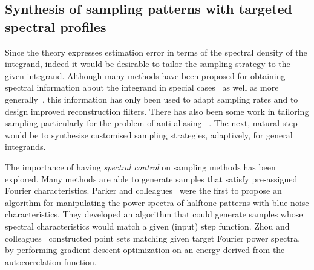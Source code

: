 \documentclass[11pt,fleqn]{book} %
\begin{document}
\subsection{Synthesis of sampling patterns with targeted spectral profiles}
Since the theory expresses estimation error in terms of the spectral density of the integrand, indeed it would be desirable to tailor the sampling strategy to the given integrand. Although many methods have been proposed for obtaining spectral information about the integrand in special cases~\cite{Egan:2009,Soler:2009,Ramamoorthi:2012,bagher:2013} as well as more generally~\cite{Durand:2005,Cov5D}, this information has only been used to adapt sampling rates and to design improved reconstruction filters. There has also been some work in tailoring sampling particularly for the problem of anti-aliasing ~\cite{Ahmed:2015:APP,Heck:2013:BNS}. The next, natural step would be to synthesise customised sampling strategies, adaptively, for general integrands. 

The importance of having \emph{spectral control} on sampling methods has been explored.  Many methods are  able to generate samples that satisfy pre-assigned Fourier characteristics. Parker and colleagues~\cite{parker1991new} were the first to propose an algorithm for manipulating the power spectra of halftone patterns with blue-noise characteristics. They developed an algorithm that could generate samples whose spectral characteristics would match a given (input) step function. Zhou and colleagues~\cite{Zhou:2012} constructed point sets matching given target Fourier power spectra, by performing  gradient-descent optimization on an energy derived from the autocorrelation function. 


%
\end{document}
